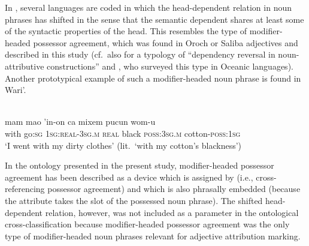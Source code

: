 In , several languages are coded in which the head-dependent relation in noun phrases has shifted in the sense that the semantic dependent shares at least some of the syntactic properties of the head. This resembles the type of modifier\hyp{}headed possessor agreement, which was found in Oroch or Saliba adjectives and described in this study (cf.~also \citealt{malchukov2000} for a typology of “dependency reversal in noun-attributive constructions” and \citealt{ross1998}, who surveyed this type in Oceanic languages). Another prototypical example of such a modifier\hyp{}headed noun phrase is found in Wari'.
\begin{exe}
\ex
\label{ex1}
\\
  \gll	mam mao 'in-on		ca	    mixem  pucun	wom-u\\
  	with  go:\textsc{sg}  \textsc{1sg:real-3sg.m}	\textsc{real}  black    \textsc{poss:3sg.m}	cotton-\textsc{poss:1sg}\\
  \glt ‘I went with my dirty clothes’ (lit.~‘with my cotton's blackness’)
\end{exe}
In the ontology presented in the present study, modifier\hyp{}headed possessor agreement has been described as a device which is assigned by  (i.e., cross-referencing possessor agreement) and which is also phrasally embedded (because the attribute takes the slot of the possessed noun phrase). The shifted head-dependent relation, however, was not included as a parameter in the ontological cross-classification because modifier\hyp{}headed possessor agreement was the only type of modifier\hyp{}headed noun phrases relevant for adjective attribution marking.

